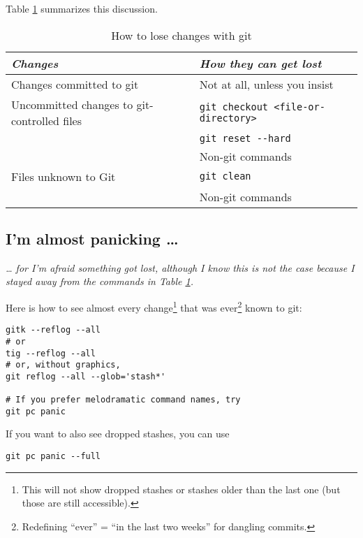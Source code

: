 \documentclass[12pt,pdftex]{article}
\begin{document}
Table \ref{Table:How-to-lose-changes} summarizes this discussion.

\begin{table}[htb]
\caption{\label{Table:How-to-lose-changes}How to lose changes with git}
\centering
\begin{tabular}{ll}
\toprule
\emph{Changes} & \emph{How they can get lost}\\
\midrule
Changes committed to git & Not at all, unless you insist \footnotemark\\
\midrule
Uncommitted changes to git-controlled files & \texttt{git checkout <file-or-directory>}\\
 & \texttt{git reset -{}-hard}\\
 & Non-git commands\\
\midrule
Files unknown to Git & \texttt{git clean}\\
 & Non-git commands\\
\bottomrule
\end{tabular}
\end{table}


\subsection{I'm almost panicking \ldots{}}
\label{sec-3-1}
\label{Section-almost-panicking}

\emph{
\ldots{} for I'm afraid something got lost, although I know this is not the
case because I stayed away from the commands in Table
\ref{Table:How-to-lose-changes}.
}

\bigskip

Here is how to see almost every change\footnote{This will not show dropped stashes or stashes older than the last
one (but those are still accessible).} that was ever\footnote{Redefining “ever” = “in the last two weeks” for dangling commits.}
known to git:
\lstset{frame=single,basicstyle=\ttfamily\footnotesize,language=sh,label= ,caption= ,captionpos=b,numbers=none}
\begin{lstlisting}
gitk --reflog --all
# or
tig --reflog --all
# or, without graphics,
git reflog --all --glob='stash*'

# If you prefer melodramatic command names, try
git pc panic
\end{lstlisting}

If you want to also see dropped stashes, you can use
\lstset{frame=single,basicstyle=\ttfamily\footnotesize,language=sh,label= ,caption= ,captionpos=b,numbers=none}
\begin{lstlisting}
git pc panic --full
\end{lstlisting}
\end{document}
